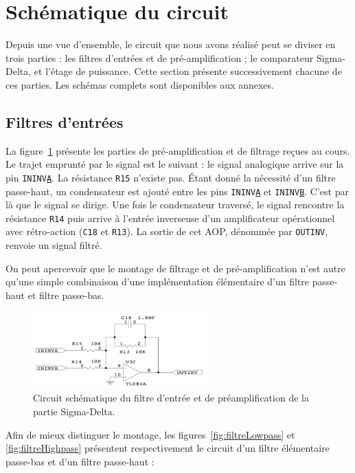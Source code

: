 \documentclass[10pt, oneside, a4paper]{article}
\begin{document}
\section{Schématique du circuit}
Depuis une vue d'ensemble, le circuit que nous avons réalisé peut se diviser en trois parties : les filtres d'entrées et de pré-amplification ; le comparateur Sigma-Delta, et l'étage de puissance.
Cette section présente successivement chacune de ces parties.
Les schémas complets sont disponibles aux annexes.

\subsection{Filtres d'entrées}
La figure~\ref{fig:schemaPreAmpli} présente les parties de pré-amplification et de filtrage reçues au cours.
Le trajet emprunté par le signal est le suivant : le signal analogique arrive sur la pin \texttt{ININV\underline{A}}.
La résistance \texttt{R15} n'existe pas.
Étant donné la nécessité d'un filtre passe-haut, un condensateur est ajouté entre les pins \texttt{ININV\underline{A}} et \texttt{ININV\underline{B}}.
C'est par là que le signal se dirige.
Une fois le condensateur traversé, le signal rencontre la résistance \texttt{R14} puis arrive à l'entrée inverseuse d'un amplificateur opérationnel avec rétro-action (\texttt{C18} et \texttt{R13}).
La sortie de cet AOP, dénommée par \texttt{OUTINV}, renvoie un signal filtré.

On peut apercevoir que le montage de filtrage et de pré-amplification n'est autre qu'une simple combinaison d'une implémentation élémentaire d'un filtre passe-haut et filtre passe-bas.
\begin{figure}[!ht]
    \centering
    \includegraphics[width=0.6\textwidth]{image/schematique-all.jpg}
    \caption{Circuit schématique du filtre d'entrée et de préamplification de la partie
             Sigma-Delta.}
    \label{fig:schemaPreAmpli}
\end{figure}

Afin de mieux distinguer le montage, les figures~\ref{fig:filtreLowpass} et \ref{fig:filtreHighpass} présentent respectivement le circuit d'un filtre élémentaire passe-bas et d'un filtre passe-haut :
\end{document}
